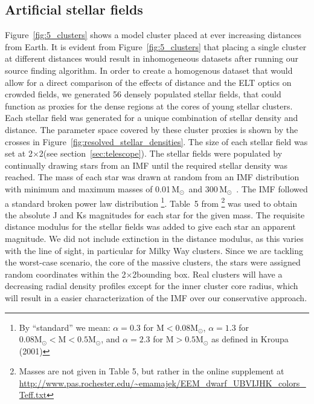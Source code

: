 \documentclass[referee]{aa}
\newcommand{\msun}{M$_\odot$~}
\begin{document}
\subsection{Artificial stellar fields}
  \label{subsec:stellar_fields}
Figure~\ref{fig:5_clusters} shows a model cluster placed at ever increasing distances from Earth.
It is evident from Figure~\ref{fig:5_clusters} that placing a single cluster at different distances would result in inhomogeneous datasets after running our source finding algorithm.
In order to create a homogenous dataset that would allow for a direct comparison of the effects of distance and the ELT optics on crowded fields, we generated 56 densely populated stellar fields, that could function as proxies for the dense regions at the cores of young stellar clusters.
Each stellar field was generated for a unique combination of stellar density and distance.
The parameter space covered by these cluster proxies is shown by the crosses in Figure~\ref{fig:resolved_stellar_densities}.
The size of each stellar field was set at 2\arcsec$\times$2\arcsec (see section~\ref{sec:telescope}).
The stellar fields were populated by continually drawing stars from an IMF until the required stellar density was reached.
The mass of each star was drawn at random from an IMF distribution with minimum and maximum masses of 0.01\,\msun and 300\,\msun.
The IMF followed a standard \citet{kroupa2001} broken power law distribution
\footnote{By ``standard'' we mean: $\alpha=0.3$ for $\mathrm{M} < 0.08 \mathrm{M}_\odot$, $\alpha=1.3$ for $0.08\mathrm{M}_\odot < \mathrm{M} < 0.5 \mathrm{M}_\odot$, and $\alpha=2.3$ for $\mathrm{M} > 0.5 \mathrm{M}_\odot$ as defined in Kroupa (2001)}.
Table~5 from \citet{pecaut2013}\footnote{Masses are not given in Table 5, but rather in the online supplement at \url{http://www.pas.rochester.edu/~emamajek/EEM_dwarf_UBVIJHK_colors_Teff.txt}}
was used to obtain the absolute J and Ks magnitudes for each star for the given mass.
The requisite distance modulus for the stellar fields was added to give each star an apparent magnitude.
We did not include extinction in the distance modulus, as this varies with the line of sight, in particular for Milky Way clusters.
Since we are tackling the worst-case scenario, the core of the massive clusters, the stars were assigned random coordinates within the 2\arcsec$\times$2\arcsec bounding box.
Real clusters will have a decreasing radial density profiles except for the inner cluster core radius, which will result in a easier characterization of the IMF over our conservative approach.
\end{document}
